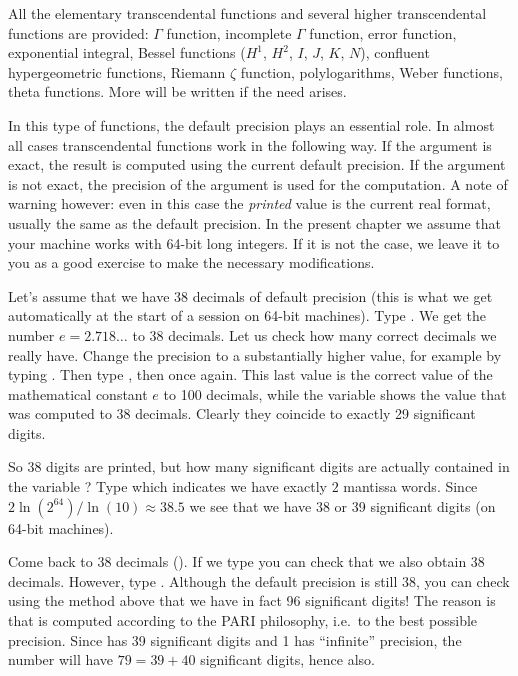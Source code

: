 All the elementary transcendental functions and several higher transcendental
functions are provided: $\Gamma$ function, incomplete $\Gamma$ function, error
function, exponential integral, Bessel functions ($H^1$, $H^2$, $I$, $J$,
$K$, $N$), confluent hypergeometric functions, Riemann $\zeta$ function,
polylogarithms, Weber functions, theta functions. More will be written if the
need arises.

In this type of functions, the default precision plays an essential role.
In almost all cases transcendental functions work in the following way.
If the argument is exact, the result is computed using the current
default precision. If the argument is not exact, the precision of the
argument is used for the computation. A note of warning however: even in this
case the \emph{printed} value is the current real format, usually the
same as the default precision. In the present chapter we assume that your
machine works with 64-bit long integers. If it is not the case, we leave it
to you as a good exercise to make the necessary modifications.

Let's assume that we have 38 decimals of default precision (this is what we
get automatically at the start of a  session on 64-bit machines). Type
. We get the number $e=2.718\dots$ to 38 decimals. Let us check
how many correct decimals we really have. Change the precision to a
substantially higher value, for example by typing . Then type
, then  once again. This last value is the correct value
of the mathematical constant $e$ to 100 decimals, while the variable 
shows the value that was computed to 38 decimals. Clearly they coincide to
exactly 29 significant digits.

So 38 digits are printed, but how many significant digits are actually
contained in the variable ? Type  which indicates we have
exactly $2$ mantissa words. Since $2\ln(2^{64}) / \ln(10)\approx38.5$ we see
that we have 38 or 39 significant digits (on 64-bit machines).

\smallskip
Come back to 38 decimals (). If we type 
you can check that we also obtain 38 decimals. However, type
. Although the default precision is still 38,
you can check using the method above that we have in fact 96 significant
digits! The reason is that  is computed according to the PARI
philosophy, i.e.~to the best possible precision. Since  has 39
significant digits and 1 has ``infinite'' precision, the number  will have $79=39+40$ significant digits, hence  also.

